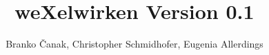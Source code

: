 \documentclass[11pt,a4paper,openany]{book}
\author{Branko Čanak, Christopher Schmidhofer, Eugenia Allerdings}
\title{weXelwirken Version 0.1}
\begin{document}
\maketitlel
\tableofcontents






\end{document}
